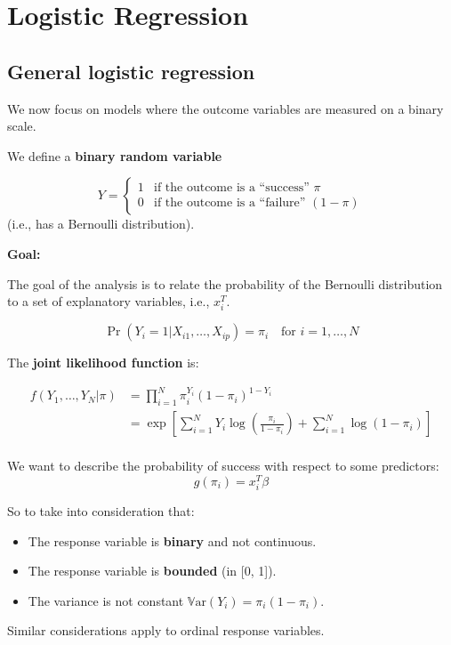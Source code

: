 \documentclass[11pt]{article}
\begin{document}
\section{Logistic Regression}

\subsection{General logistic regression}

We now focus on models where the outcome variables are measured on a binary scale.

We define a \textbf{binary random variable}

\[
Y =
\begin{cases}
1 & \text{if the outcome is a “success” } \pi \\
0 & \text{if the outcome is a “failure” } (1 - \pi)
\end{cases}
\]
(i.e., has a Bernoulli distribution).

\textbf{Goal:}

The goal of the analysis is to relate the probability of the Bernoulli distribution to a set of explanatory variables, i.e., $x_i^T$.

\[ \Pr(Y_i = 1 | X_{i1}, \ldots, X_{ip}) = \pi_i \quad \text{for } i = 1, \ldots, N \]

The \textbf{joint likelihood function} is:

\begin{align}
    f(Y_1, \ldots, Y_N | \pi) &= \prod_{i=1}^N \pi_i^{Y_i} (1 - \pi_i)^{1-Y_i} \\
    &= \exp \left[ \sum_{i=1}^N Y_i \log \left( \frac{\pi_i}{1 - \pi_i} \right) + \sum_{i=1}^N \log(1 - \pi_i) \right] \\
\end{align}

We want to describe the probability of success with respect to some predictors:
\[ g(\pi_i) = x_i^T \beta \]

So to take into consideration that:
\begin{itemize}
    \item The response variable is \textbf{binary} and not continuous.
    \item The response variable is \textbf{bounded} (in [0, 1]).
    \item The variance is not constant $\mathbb{V}\text{ar}(Y_i) = \pi_i(1 - \pi_i)$.
\end{itemize}

Similar considerations apply to ordinal response variables.
\end{document}
